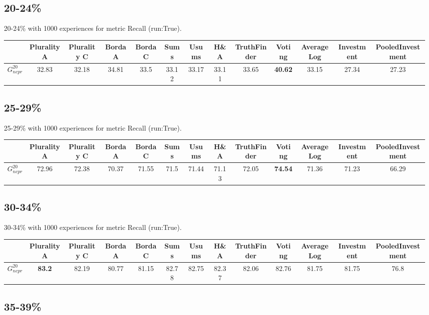 \documentclass{article}
\newcommand{\graph}[2]{$G_{#1}^{#2}$}
\begin{document}
\subsection{20-24\%}

20-24\% with 1000 experiences for metric Recall (run:True).

\noindent\begin{tabular}{|l|c|c|c|c|c|c|c|c|c|c|c|c|}
\hline
& Plurality A& Plurality C& Borda A& Borda C& Sums& Usums& H\&A& TruthFinder& Voting& AverageLog& Investment& PooledInvestment\\
\hline
\graph{ncpr}{20} &32.83&32.18&34.81&33.5&33.12&33.17&33.11&33.65&\textbf{40.62}&33.15&27.34&27.23\\
\hline
\end{tabular}
\newpage

\subsection{25-29\%}

25-29\% with 1000 experiences for metric Recall (run:True).

\noindent\begin{tabular}{|l|c|c|c|c|c|c|c|c|c|c|c|c|}
\hline
& Plurality A& Plurality C& Borda A& Borda C& Sums& Usums& H\&A& TruthFinder& Voting& AverageLog& Investment& PooledInvestment\\
\hline
\graph{ncpr}{20} &72.96&72.38&70.37&71.55&71.5&71.44&71.13&72.05&\textbf{74.54}&71.36&71.23&66.29\\
\hline
\end{tabular}
\newpage

\subsection{30-34\%}

30-34\% with 1000 experiences for metric Recall (run:True).

\noindent\begin{tabular}{|l|c|c|c|c|c|c|c|c|c|c|c|c|}
\hline
& Plurality A& Plurality C& Borda A& Borda C& Sums& Usums& H\&A& TruthFinder& Voting& AverageLog& Investment& PooledInvestment\\
\hline
\graph{ncpr}{20} &\textbf{83.2}&82.19&80.77&81.15&82.78&82.75&82.37&82.06&82.76&81.75&81.75&76.8\\
\hline
\end{tabular}
\newpage

\subsection{35-39\%}
\end{document}
